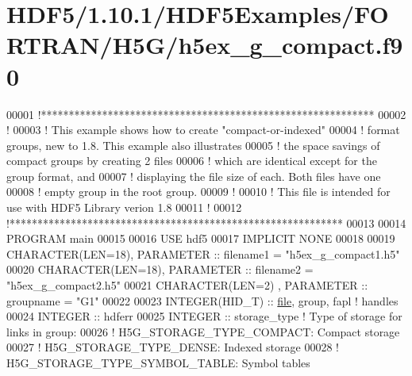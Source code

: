 \hypertarget{_h_d_f5_21_810_81_2_h_d_f5_examples_2_f_o_r_t_r_a_n_2_h5_g_2h5ex__g__compact_8f90_source}{}\section{H\+D\+F5/1.10.1/\+H\+D\+F5\+Examples/\+F\+O\+R\+T\+R\+A\+N/\+H5\+G/h5ex\+\_\+g\+\_\+compact.f90}
\label{_h_d_f5_21_810_81_2_h_d_f5_examples_2_f_o_r_t_r_a_n_2_h5_g_2h5ex__g__compact_8f90_source}

\begin{DoxyCode}
00001 \textcolor{comment}{!************************************************************}
00002 \textcolor{comment}{!}
00003 \textcolor{comment}{!  This example shows how to create "compact-or-indexed"}
00004 \textcolor{comment}{!  format groups, new to 1.8.  This example also illustrates}
00005 \textcolor{comment}{!  the space savings of compact groups by creating 2 files}
00006 \textcolor{comment}{!  which are identical except for the group format, and}
00007 \textcolor{comment}{!  displaying the file size of each.  Both files have one}
00008 \textcolor{comment}{!  empty group in the root group.}
00009 \textcolor{comment}{!}
00010 \textcolor{comment}{!  This file is intended for use with HDF5 Library verion 1.8}
00011 \textcolor{comment}{!}
00012 \textcolor{comment}{!************************************************************}
00013 
00014 \textcolor{keyword}{PROGRAM} main
00015 
00016   \textcolor{keywordtype}{USE }hdf5
00017   \textcolor{keywordtype}{IMPLICIT NONE}
00018 
00019   \textcolor{keywordtype}{CHARACTER(LEN=18)}, \textcolor{keywordtype}{PARAMETER} :: filename1 = \textcolor{stringliteral}{"h5ex\_g\_compact1.h5"}
00020   \textcolor{keywordtype}{CHARACTER(LEN=18)}, \textcolor{keywordtype}{PARAMETER} :: filename2 = \textcolor{stringliteral}{"h5ex\_g\_compact2.h5"}
00021   \textcolor{keywordtype}{CHARACTER(LEN=2)} , \textcolor{keywordtype}{PARAMETER} :: groupname  = \textcolor{stringliteral}{"G1"}
00022 
00023   \textcolor{keywordtype}{INTEGER(HID\_T)}   :: \hyperlink{structfile}{file}, group, fapl \textcolor{comment}{! handles}
00024   \textcolor{keywordtype}{INTEGER} :: hdferr
00025   \textcolor{keywordtype}{INTEGER} :: storage\_type \textcolor{comment}{! Type of storage for links in group:}
00026                           \textcolor{comment}{!   H5G\_STORAGE\_TYPE\_COMPACT: Compact storage}
00027                           \textcolor{comment}{!   H5G\_STORAGE\_TYPE\_DENSE: Indexed storage}
00028                           \textcolor{comment}{!   H5G\_STORAGE\_TYPE\_SYMBOL\_TABLE: Symbol tables}

\end{DoxyCode}
